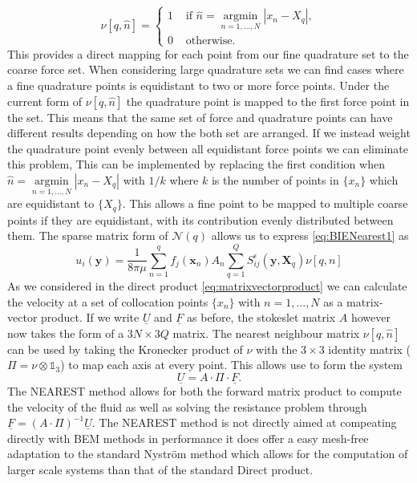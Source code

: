 \begin{equation}
\label{eq:NNMatrix}
    \nu [q, \hat{n}]= \begin{cases} 1 & \text { if } \hat{n}=\underset{n=1, \ldots, N}{\operatorname{argmin}}|x_n-X_q| , \\ 0 & \text { otherwise. }\end{cases}
\end{equation}
This provides a direct mapping for each point from our fine quadrature set to the coarse force set. When considering large quadrature sets we can find cases where a fine quadrature points is equidistant to two or more force points. Under the current form of $\nu [q, \hat{n}]$ the quadrature point is mapped to the first force point in the set. This means that the same set of force and quadrature points can have different results depending on how the both set are arranged. If we instead weight the quadrature point evenly between all equidistant force points we can eliminate this problem, This can be implemented by replacing the first condition when $\hat{n}=\underset{n=1, \ldots, N}{\operatorname{argmin}}|x_n-X_q|$ with $1/k$ where $k$ is the number of points in $\{x_n\}$ which are equidistant to $\{X_q\}$. This allows a fine point to be mapped to multiple coarse points if they are equidistant, with its contribution evenly distributed between them. The sparse matrix form of $\mathcal{N}(q)$ allows us to express \cref{eq:BIENearest1} as 
\begin{equation}
    u_i(\bm{y}) = \frac{1}{8 \pi \mu} \sum_{n=1}^q  f_{j}(\bm{x}_n) A_n \sum_{q=1}^{Q}S_{i j}^{\epsilon}\left(\bm{y}, \bm{X}_q\right) \nu[q,n] 
\end{equation}
As we considered in the direct product \cref{eq:matrixvectorproduct} we can calculate the velocity at a set of collocation points $\{x_n\}$ with $n=1,\dots,N$ as a matrix-vector product. If we write $\underline{U}$ and $\underline{F}$ as before, the stokeslet matrix $A$ however now takes the form of a $3N \times 3Q$ matrix. The nearest neighbour matrix $\nu [q, \hat{n}]$ can be used by taking the Kronecker product of $\nu$ with the $3 \times 3$ identity matrix ($\Pi = \nu \otimes \mathds{1}_{3}$) to map each axis at every point. This allows use to form the system
\begin{equation}
    \underline{U} = A \cdot \Pi \cdot \underline{F}.
\end{equation}
The NEAREST method allows for both the forward matrix product to compute the velocity of the fluid as well as solving the resistance problem through $\underline{F} = (A \cdot \Pi)^{-1} \underline{U}$. The NEAREST method is not directly aimed at compeating directly with BEM methods in performance it does offer a easy mesh-free adaptation to the standard Nyström method which allows for the computation of larger scale systems than that of the standard Direct product.

